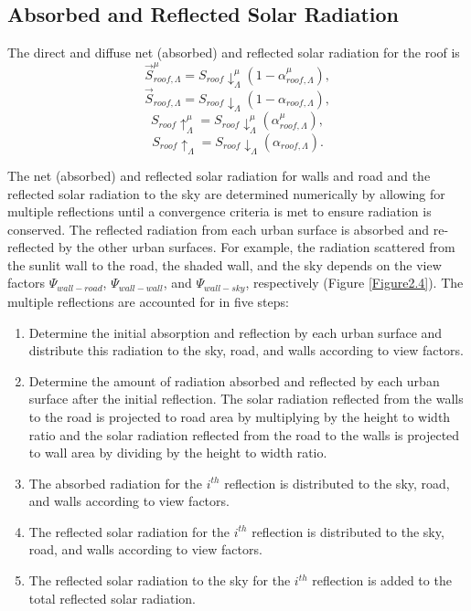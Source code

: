 \documentclass[12pt,authoryear]{elsarticle}
\numberwithin{equation}{section} %
\begin{document}
\subsection{Absorbed and Reflected Solar Radiation}
\label{sec:absorbed_reflected_solar_radiation}
%
The direct and diffuse net (absorbed) and reflected solar radiation for the roof is
\begin{equation}
\vec{S}_{roof,\Lambda}^\mu = S_{roof}\downarrow_{\Lambda}^{\mu}(1-\alpha_{roof,\Lambda}^\mu),
\end{equation}
\begin{equation}
\vec{S}_{roof,\Lambda} = S_{roof}\downarrow_{\Lambda}(1-\alpha_{roof,\Lambda}),
\end{equation}
\begin{equation}
S_{roof}\uparrow_{\Lambda}^\mu = S_{roof}\downarrow_{\Lambda}^{\mu}(\alpha_{roof,\Lambda}^\mu),
\end{equation}
\begin{equation}
S_{roof}\uparrow_{\Lambda} = S_{roof}\downarrow_{\Lambda}(\alpha_{roof,\Lambda}).
\end{equation}

The net (absorbed) and reflected solar radiation for walls and road and the reflected solar radiation to the sky are determined numerically by allowing for multiple reflections until a convergence criteria is met to ensure radiation is conserved. The reflected radiation from each urban surface is absorbed and re-reflected by the other urban surfaces. For example, the radiation scattered from the sunlit wall to the road, the shaded wall, and the sky depends on the view factors $\Psi_{wall-road}$, $\Psi_{wall-wall}$, and $\Psi_{wall-sky}$, respectively (Figure \ref{Figure2.4}). The multiple reflections are accounted for in five steps: 
\begin{enumerate}
\item Determine the initial absorption and reflection by each urban surface and distribute this radiation to the sky, road, and walls according to view factors. 
\item Determine the amount of radiation absorbed and reflected by each urban surface after the initial reflection. The solar radiation reflected from the walls to the road is projected to road area by multiplying by the height to width ratio and the solar radiation reflected from the road to the walls is projected to wall area by dividing by the height to width ratio. 
\item The absorbed radiation for the $i^{th}$ reflection is distributed to the sky, road, and walls according to view factors. 
\item The reflected solar radiation for the $i^{th}$ reflection is distributed to the sky, road, and walls according to view factors. 
\item The reflected solar radiation to the sky for the $i^{th}$ reflection is added to the total reflected solar radiation.
\end{enumerate}
\end{document}
